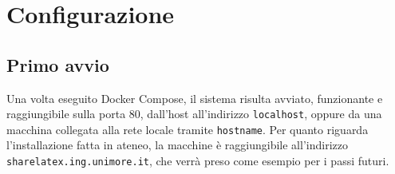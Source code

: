 \chapter{Configurazione}
\label{Configurazione}
\thispagestyle{empty}

\section{Primo avvio}
Una volta eseguito Docker Compose, il sistema risulta avviato, funzionante e raggiungibile sulla porta 80, dall'host all'indirizzo \verb|localhost|, oppure da una macchina collegata alla rete locale tramite \verb|hostname|. Per quanto riguarda l'installazione fatta in ateneo, la macchine è raggiungibile all'indirizzo \verb|sharelatex.ing.unimore.it|, che verrà preso come esempio per i passi futuri.

